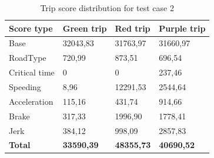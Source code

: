 \begin{table}
    \begin{tabular}{llll}
    \textbf{Score type} & \textbf{Green trip} & \textbf{Red trip} & \textbf{Purple trip}\\ \hline
    Base                & 32043,83            & 31763,97          & 31660,97            \\
    RoadType            & 720,99              & 873,51            & 696,54              \\
    Critical time       & 0                   & 0                 & 237,46              \\
    Speeding            & 8,96                & 12291,53          & 2544,64             \\
    Acceleration        & 115,16              & 431,74            & 914,66              \\
    Brake               & 317,33              & 1996,90           & 1778,41             \\
    Jerk                & 384,12              & 998,09            & 2857,83             \\ \hline
    \textbf{Total}      & \textbf{33590,39}   & \textbf{48355,73} & \textbf{40690,52}   \\ \hline
    \end{tabular}
    \caption{Trip score distribution for test case 2}
    \label{tab:longtripscores}
\end{table}

